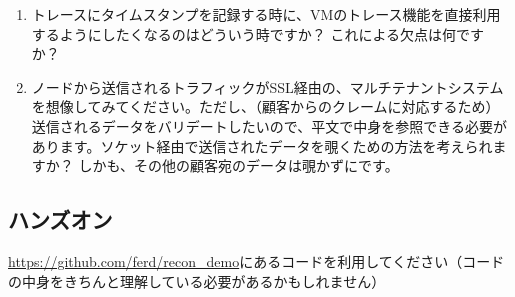 \begin{enumerate}
	\item トレースにタイムスタンプを記録する時に、VMのトレース機能を直接利用するようにしたくなるのはどういう時ですか？ これによる欠点は何ですか？
	\item ノードから送信されるトラフィックがSSL経由の、マルチテナントシステムを想像してみてください。ただし、（顧客からのクレームに対応するため）送信されるデータをバリデートしたいので、平文で中身を参照できる必要があります。ソケット経由で送信されたデータを覗くための方法を考えられますか？ しかも、その他の顧客宛のデータは覗かずにです。
\end{enumerate}

\subsection*{ハンズオン}

\href{https://github.com/ferd/recon\_demo}{https://github.com/ferd/recon\_demo}にあるコードを利用してください（コードの中身をきちんと理解している必要があるかもしれません）

